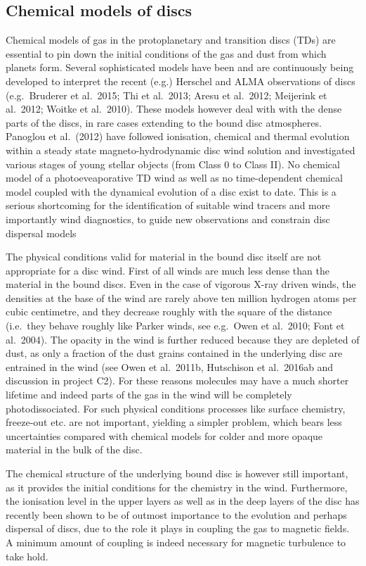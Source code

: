 \documentclass[10pt,fleqn,twoside]{article}
\begin{document}
\subsection{Chemical models of discs}

Chemical models of gas in the protoplanetary and transition discs
(TDs) are essential to pin down the initial conditions of the gas and
dust from which planets form. Several sophisticated models have been
and are continuously being developed to interpret the recent (e.g.)
Herschel and ALMA observations of discs (e.g.\ Bruderer et al.\ 2015;
Thi et al.\ 2013; Aresu et al.\ 2012; Meijerink et al.\ 2012; Woitke
et al.\ 2010). These models however deal with with the dense parts of
the discs, in rare cases extending to the bound disc
atmospheres. Panoglou et al.\ (2012) have followed ionisation,
chemical and thermal evolution within a steady state
magneto-hydrodynamic disc wind solution and investigated various
stages of young stellar objects (from Class 0 to Class II).  No
chemical model of a photoeveaporative TD wind as well as no
time-dependent chemical model coupled with the dynamical evolution of
a disc exist to date. This is a serious shortcoming for the
identification of suitable wind tracers and more importantly wind
diagnostics, to guide new observations and constrain disc dispersal
models 

The physical conditions valid for material in the bound disc itself
are not appropriate for a disc wind. First of all winds are much less
dense than the material in the bound discs. Even in the case of
vigorous X-ray driven winds, the densities at the base of the wind are
rarely above ten million hydrogen atoms per cubic centimetre, and they
decrease roughly with the square of the distance (i.e.\ they behave
roughly like Parker winds, see e.g.\ Owen et al.\ 2010; Font et al.\
2004). The opacity in the wind is further reduced because they are
depleted of dust, as only a fraction of the dust grains contained
in the underlying disc are entrained in the wind (see Owen et al.\
2011b, Hutschison et al.\ 2016ab and discussion in project C2). For
these reasons molecules may have a much shorter lifetime and indeed
parts of the gas in the wind will be completely photodissociated. For
such physical conditions processes like surface chemistry, freeze-out
etc. are not important, yielding a simpler problem, which bears less
uncertainties compared with chemical models for colder and more opaque
material in the bulk of the disc.  

The chemical structure of the underlying bound disc is however still
important, as it provides the initial conditions for the chemistry in
the wind. Furthermore, the ionisation level in the upper layers as
well as in the deep layers of the disc has recently been shown to be of outmost importance to the evolution and perhaps dispersal of discs, due to the role it plays in coupling the gas to magnetic fields. A minimum amount of coupling is indeed necessary for magnetic turbulence to take hold.
\end{document}
